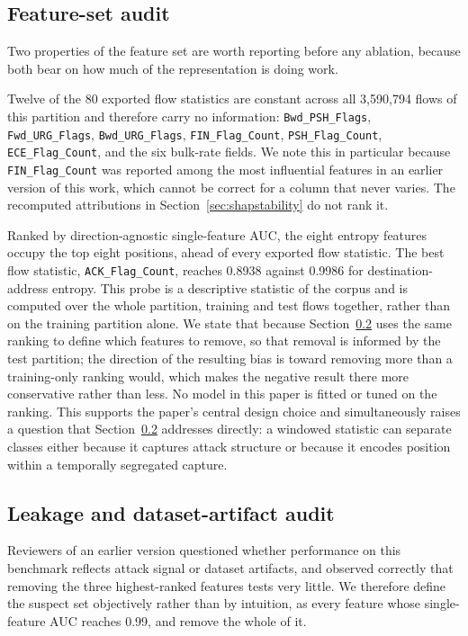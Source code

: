 \documentclass{ieeeaccess}
\begin{document}
\subsection{Feature-set audit}
\label{sec:featureaudit}
Two properties of the feature set are worth reporting before any ablation, because both bear on how much of the representation is doing work.

Twelve of the 80 exported flow statistics are constant across all 3,590,794 flows of this partition and therefore carry no information: \texttt{Bwd\_PSH\_Flags}, \texttt{Fwd\_URG\_Flags}, \texttt{Bwd\_URG\_Flags}, \texttt{FIN\_Flag\_Count}, \texttt{PSH\_Flag\_Count}, \texttt{ECE\_Flag\_Count}, and the six bulk-rate fields. We note this in particular because \texttt{FIN\_Flag\_Count} was reported among the most influential features in an earlier version of this work, which cannot be correct for a column that never varies. The recomputed attributions in Section~\ref{sec:shapstability} do not rank it.

Ranked by direction-agnostic single-feature AUC, the eight entropy features occupy the top eight positions, ahead of every exported flow statistic. The best flow statistic, \texttt{ACK\_Flag\_Count}, reaches 0.8938 against 0.9986 for destination-address entropy. This probe is a descriptive statistic of the corpus and is computed over the whole partition, training and test flows together, rather than on the training partition alone. We state that because Section~\ref{sec:leakage} uses the same ranking to define which features to remove, so that removal is informed by the test partition; the direction of the resulting bias is toward removing more than a training-only ranking would, which makes the negative result there more conservative rather than less. No model in this paper is fitted or tuned on the ranking. This supports the paper's central design choice and simultaneously raises a question that Section~\ref{sec:leakage} addresses directly: a windowed statistic can separate classes either because it captures attack structure or because it encodes position within a temporally segregated capture.

\subsection{Leakage and dataset-artifact audit}
\label{sec:leakage}
Reviewers of an earlier version questioned whether performance on this benchmark reflects attack signal or dataset artifacts, and observed correctly that removing the three highest-ranked features tests very little. We therefore define the suspect set objectively rather than by intuition, as every feature whose single-feature AUC reaches 0.99, and remove the whole of it.
\end{document}
